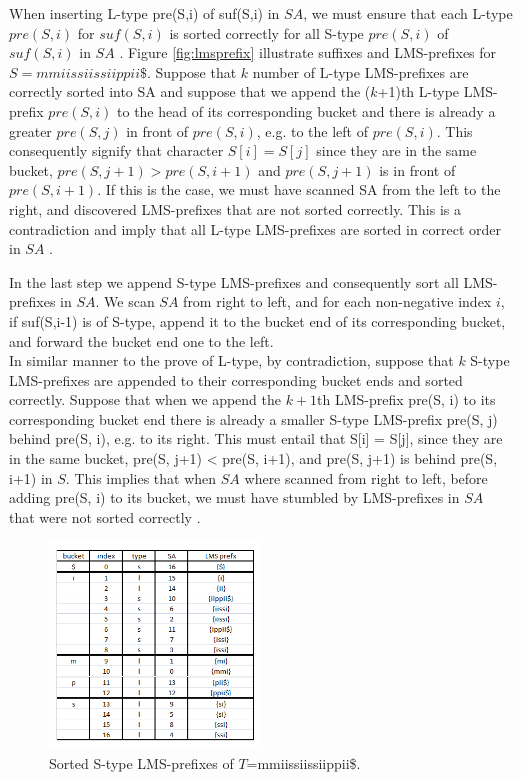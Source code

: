 \documentclass[12pt]{article} %
\begin{document}
When inserting L-type pre(S,i) of suf(S,i) in $SA$, we must ensure that each L-type $pre(S,i)$ for $suf(S,i)$ is sorted correctly for all S-type $pre(S,i)$ of $suf(S,i)$ in $SA$ \cite{twoeffecient}. Figure \ref{fig:lmsprefix} illustrate suffixes and LMS-prefixes for $S=mmiissiissiippii\$$. Suppose that $k$ number of L-type LMS-prefixes are correctly sorted into SA and suppose that we append the ($k$+1)th L-type LMS-prefix $pre(S,i)$ to the head of its corresponding bucket and there is already a greater $pre(S,j)$ in front of $pre(S,i)$, e.g. to the left of $pre(S,i)$. This consequently signify that character $S[i]=S[j]$ since they are in the same bucket, $pre(S, j+1) > pre(S, i+1)$ and $pre(S, j+1)$ is in front of $pre(S, i+1)$. If this is the case, we must have scanned SA from the left to the right, and discovered LMS-prefixes that are not sorted correctly. This is a contradiction and imply that all L-type LMS-prefixes are sorted in correct order in $SA$ \cite{twoeffecient}. 

In the last step we append S-type LMS-prefixes and consequently sort all LMS-prefixes in $SA$. We scan $SA$ from right to left, and for each non-negative index $i$, if suf(S,i-1) is of S-type, append it to the bucket end of its corresponding bucket, and forward the bucket end one to the left. \\
In similar manner to the prove of L-type, by contradiction, suppose that $k$ S-type LMS-prefixes are appended to their corresponding bucket ends and sorted correctly. Suppose that when we append the $k+1$th LMS-prefix pre(S, i) to its corresponding bucket end there is already a smaller S-type LMS-prefix pre(S, j) behind pre(S, i), e.g. to its right. This must entail that S[i] = S[j], since they are in the same bucket, pre(S, j+1) < pre(S, i+1), and pre(S, j+1) is behind pre(S, i+1) in $S$. This implies that when $SA$ where scanned from right to left, before adding pre(S, i) to its bucket, we must have stumbled by LMS-prefixes in $SA$ that were not sorted correctly \cite{twoeffecient}.
\begin{figure}[H]
    \centering
    \includegraphics[width=0.5\textwidth]{lmssorteds}
    \captionsetup{width=0.8\textwidth}
    \caption{Sorted S-type LMS-prefixes of  $T$=mmiissiissiippii\$.}
    \label{fig:lmssorteds}  
\end{figure}
\end{document}
